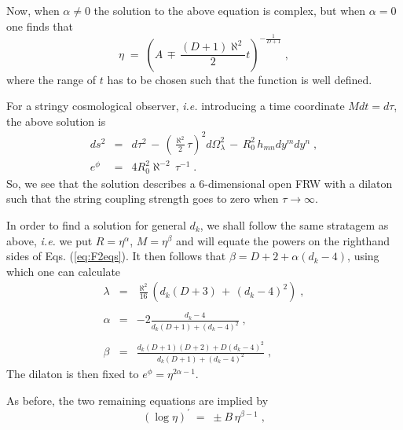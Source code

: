 \documentclass[a4paper,11pt]{article}
\begin{document}
Now, when $\alpha\neq 0$ the solution to the above equation is complex, but
when $\alpha =0$ one finds that 
\begin{equation}
 \eta \;=\; \left(
               A \,\mp\, \frac{(D+1)\aleph^{2}}{2}t
            \right)^{-\frac{1}{D+1}} \; ,
\end{equation}
where the range of $t$ has to be chosen such that the function is 
well defined.
\par
For a stringy cosmological observer, {\em i.e.} introducing a time 
coordinate $Mdt=d\tau$, the above solution is 
\begin{eqnarray}
ds^{2} &=& d\tau^{2}
       \,-\, \left( \frac{\aleph^{2}}{2}\tau\right)^{2}d\Omega^{2}_{\lambda}
       \,-\, R_{0}^{2}\,h_{mn}dy^{m}dy^{n} \; ,\\
e^{\phi} &=& 4R_{0}^{2}\aleph^{-2}\, \tau^{-1} \; .
\end{eqnarray}
So, we see that the solution describes a 6-dimensional open 
FRW with a dilaton such that 
the string coupling strength goes to zero when $\tau\rightarrow\infty$.
\par
In order to find a solution for general $d_{k}$, we shall follow the 
same stratagem as above,
{\it i.e.} we put $R =\eta^{\alpha}$, $M=\eta^{\beta}$ and will equate the 
powers on the righthand sides of Eqs. (\ref{eq:F2eqs}). It then follows that 
$\beta = D+2+\alpha (d_{k}-4)$, using which one can calculate
\begin{eqnarray}
\lambda &=& \frac{\aleph^{2}}{16}\left(
                 d_{k}(D+3)\,+\, (d_{k}-4)^{2}
            \right) \; , \label{eq:F2lambda} \\
%
&& \nonumber \\
%
\alpha &=& -2\frac{d_{k}-4}{d_{k}(D+1)+(d_{k}-4)^{2}} \; ,\label{eq:F2alpha} \\
%
&& \nonumber \\
%
\beta &=& \frac{d_{k}(D+1)(D+2)+D(d_{k}-4)^{2}}{d_{k}(D+1)+(d_{k}-4)^{2}} \; ,
\label{eq:F2beta}
\end{eqnarray}
The dilaton is then fixed to $e^{\phi}=\eta^{2\alpha -1}$.
\par
As before, the two remaining equations are implied by
\begin{equation}
\left(\log \eta\right)^{\prime} \;=\; \pm B\, \eta^{\beta -1} \; ,
\end{equation}
\end{document}

